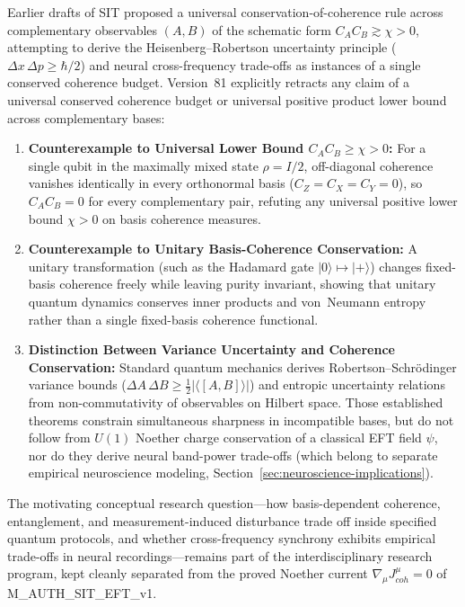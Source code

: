 \documentclass[american,11pt,letterpaper]{article}
\def\mathcal#1{#1}%
\def\mathrm#1{#1}%
\def\texttt#1{#1}%
\def\emph#1{#1}%
\begin{document}
Earlier drafts of SIT proposed a universal conservation-of-coherence rule across complementary observables $(A, B)$ of the schematic form $\mathcal{C}_A \mathcal{C}_B \gtrsim \chi > 0$, attempting to derive the Heisenberg--Robertson uncertainty principle ($\Delta x\,\Delta p \ge \hbar/2$) and neural cross-frequency trade-offs as instances of a single conserved coherence budget. Version~81 explicitly \emph{retracts} any claim of a universal conserved coherence budget or universal positive product lower bound across complementary bases:
\begin{enumerate}[leftmargin=2em]
  \item \textbf{Counterexample to Universal Lower Bound $\mathcal{C}_A \mathcal{C}_B \ge \chi > 0$:} For a single qubit in the maximally mixed state $\rho = I/2$, off-diagonal coherence vanishes identically in \emph{every} orthonormal basis ($\mathcal{C}_Z = \mathcal{C}_X = \mathcal{C}_Y = 0$), so $\mathcal{C}_A \mathcal{C}_B = 0$ for every complementary pair, refuting any universal positive lower bound $\chi > 0$ on basis coherence measures.
  \item \textbf{Counterexample to Unitary Basis-Coherence Conservation:} A unitary transformation (such as the Hadamard gate $|0\rangle \mapsto |+\rangle$) changes fixed-basis coherence freely while leaving purity invariant, showing that unitary quantum dynamics conserves inner products and von~Neumann entropy rather than a single fixed-basis coherence functional.
  \item \textbf{Distinction Between Variance Uncertainty and Coherence Conservation:} Standard quantum mechanics derives Robertson--Schr\"odinger variance bounds ($\Delta A\,\Delta B \ge \frac{1}{2}|\langle[A,B]\rangle|$) and entropic uncertainty relations from non-commutativity of observables on Hilbert space. Those established theorems constrain simultaneous sharpness in incompatible bases, but do not follow from $U(1)$ Noether charge conservation of a classical EFT field $\psi$, nor do they derive neural band-power trade-offs (which belong to separate empirical neuroscience modeling, Section~\ref{sec:neuroscience-implications}).
\end{enumerate}

The motivating conceptual research question---how basis-dependent coherence, entanglement, and measurement-induced disturbance trade off inside specified quantum protocols, and whether cross-frequency synchrony exhibits empirical trade-offs in neural recordings---remains part of the interdisciplinary research program, kept cleanly separated from the proved Noether current $\nabla_\mu J^\mu_{\mathrm{coh}} = 0$ of \texttt{M\_AUTH\_SIT\_EFT\_v1}.
\end{document}

